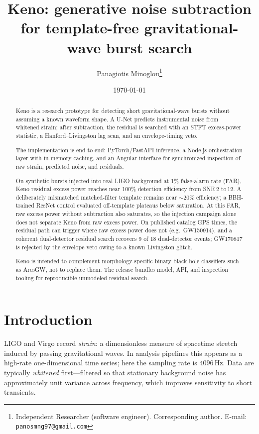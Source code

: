 \documentclass[11pt,a4paper]{article}
\title{Keno: generative noise subtraction for template-free gravitational-wave burst search}
\author{
  Panagiotis Minoglou\thanks{Independent Researcher (software engineer).
  Corresponding author. E-mail: \texttt{panosmng97@gmail.com}}
}
\date{\today}
\begin{document}
\maketitle

\begin{abstract}
Keno is a research prototype for detecting short gravitational-wave bursts
without assuming a known waveform shape. A U-Net predicts instrumental noise
from whitened strain; after subtraction, the residual is searched with an STFT
excess-power statistic, a Hanford--Livingston lag scan, and an envelope-timing
veto.

The implementation is end to end: PyTorch/FastAPI inference, a Node.js
orchestration layer with in-memory caching, and an Angular interface for
synchronized inspection of raw strain, predicted noise, and residuals.

On synthetic bursts injected into real LIGO background at 1\% false-alarm rate
(FAR), Keno residual excess power reaches near 100\% detection efficiency from
SNR\,2 to\,12. A deliberately mismatched matched-filter template remains near
$\sim$20\% efficiency; a BBH-trained ResNet control evaluated off-template
plateaus below saturation. At this FAR, raw excess power without subtraction
also saturates, so the injection campaign alone does not separate Keno from
raw excess power. On published catalog GPS times, the residual path can
trigger where raw excess power does not (e.g.\ GW150914), and a coherent
dual-detector residual search recovers 9 of 18 dual-detector events; GW170817
is rejected by the envelope veto owing to a known Livingston glitch.

Keno is intended to complement morphology-specific binary black hole
classifiers such as AresGW, not to replace them. The release bundles model,
API, and inspection tooling for reproducible unmodeled residual search.
\end{abstract}

\section{Introduction}

LIGO and Virgo record \emph{strain}: a dimensionless measure of spacetime
stretch induced by passing gravitational waves. In analysis pipelines this
appears as a high-rate one-dimensional time series; here the sampling rate is
$4096\,\mathrm{Hz}$. Data are typically \emph{whitened} first---filtered so
that stationary background noise has approximately unit variance across
frequency, which improves sensitivity to short transients.
\end{document}
